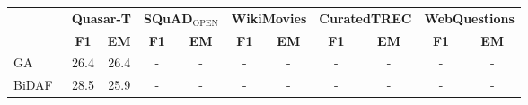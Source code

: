 \documentclass[letterpaper]{article} %
\begin{document}
\begin{table*}[t]
\centering
\small
\begin{tabular}{lcccccccccc}
\toprule
                  & \multicolumn{2}{c}{\bf Quasar-T} & \multicolumn{2}{c}{\bf SQuAD$_{\textrm{OPEN}}$} & \multicolumn{2}{c}{\bf WikiMovies}  & \multicolumn{2}{c}{\bf CuratedTREC} & \multicolumn{2}{c}{\bf WebQuestions}\\
                  & \bf F1            & \bf EM            & \bf F1            & \bf EM            & \bf F1               & \bf EM               & \bf F1               & \bf EM               & \bf F1               & \bf EM              \\
\midrule
GA~\cite{dhingra2016gated}               & 26.4          & 26.4          & -             & -             & -                & -                & -                & -                & -                & -               \\
BiDAF~\cite{seo2016bidirectional}           & 28.5          & 25.9          & -             & -             & -                & -                & -                & -                & -                & -               \\


\end{tabular}
\end{table*}
\end{document}
